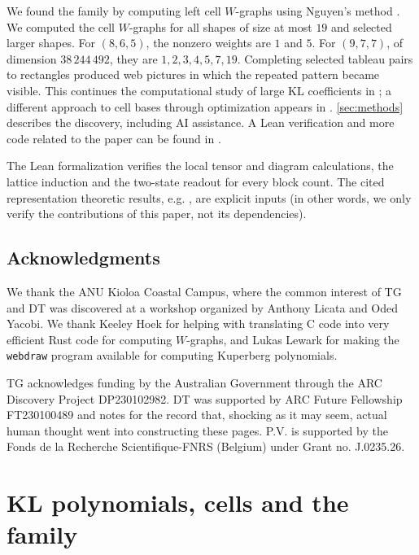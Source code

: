 \documentclass[a4paper,11pt]{amsart}
\numberwithin{equation}{subsection}
\theoremstyle{plain}
\theoremstyle{definition}
\theoremstyle{remark}
\begin{document}
We found the family by computing left cell $W$-graphs using Nguyen's
method \cite{Nguyen}. We computed the cell $W$-graphs for
all shapes of size at most $19$ and selected larger shapes. For $(8,6,5)$, the nonzero weights are
$1$ and $5$. For $(9,7,7)$, of dimension $38\,244\,492$, they are
$1,2,3,4,5,7,19$. Completing selected tableau pairs to rectangles
produced web pictures in which the repeated pattern became visible.
This continues the computational study of large KL coefficients in
\cite{LTVBigData}; a different approach to cell bases through
optimization appears in \cite{GoertzenWilliamson}. \autoref{sec:methods} describes the discovery,
including AI assistance. A Lean verification and more code related to the paper 
can be found in \cite{GoLaTuVa-mu-code}.

\begin{remark}\label{rem:verification}
The Lean formalization verifies the local tensor and diagram
calculations, the lattice induction and the two-state readout for
every block count. The cited representation theoretic results, e.g. \cite{FKK,KK}, are
explicit inputs (in other words, we only verify the 
contributions of this paper, not its dependencies).
\end{remark}

\subsection*{Acknowledgments}

We thank the ANU Kioloa Coastal Campus, where the common interest of
TG and DT was discovered at a workshop organized by Anthony Licata
and Oded Yacobi. We thank Keeley Hoek for helping with
translating C code into very efficient Rust code for computing
$W$-graphs, and Lukas Lewark for making the
\texttt{webdraw} program available for computing Kuperberg polynomials.

TG acknowledges funding by the Australian Government
through the ARC Discovery Project DP230102982. DT was supported by 
ARC Future Fellowship FT230100489 and notes for the record that, 
shocking as it may seem, actual human thought went into constructing these pages.
P.V. is supported by the Fonds de la Recherche Scientifique-FNRS (Belgium) under Grant no. J.0235.26.

\section{KL polynomials, cells and the family}\label{sec:preliminaries}
\end{document}
